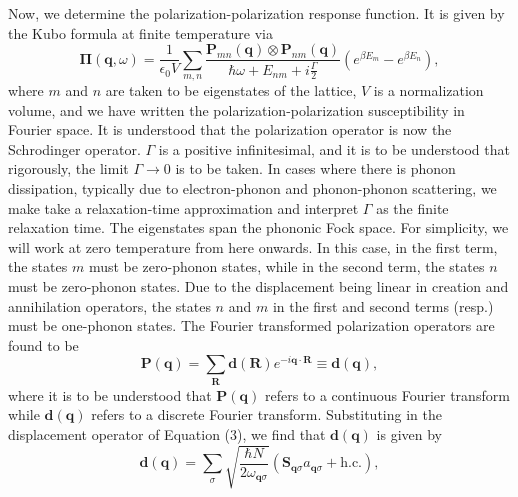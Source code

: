 \documentclass[aps,prb,twocolumn,
	groupedaddress,superscriptaddress,
	amsfonts,amssymb,amsmath,floatfix,
	citeautoscript]{revtex4-1}
\begin{document}
Now, we determine the polarization-polarization response function. It is given by the Kubo formula at finite temperature via
\begin{equation}
\boldsymbol{\Pi}(\mathbf{q},\omega) =  \frac{1}{\epsilon_0 V}\sum\limits_{m,n}\frac{\mathbf{P}_{mn}(\mathbf{q})\otimes\mathbf{P}_{nm}(\mathbf{q})}{\hbar\omega + E_{nm}+i\frac{\Gamma}{2}}\left(e^{\beta E_m}-e^{\beta E_n} \right),
\end{equation}
where $m$ and $n$ are taken to be eigenstates of the lattice, $V$ is a normalization volume, and we have written the polarization-polarization susceptibility in Fourier space. It is understood that the polarization operator is now the Schrodinger operator. $\Gamma$ is a positive infinitesimal, and it is to be understood that rigorously, the limit $\Gamma \rightarrow 0$ is to be taken. In cases where there is phonon dissipation, typically due to electron-phonon and phonon-phonon scattering, we make take a relaxation-time approximation and interpret $\Gamma$ as the finite relaxation time. The eigenstates span the phononic Fock space. For simplicity, we will work at zero temperature from here onwards. In this case, in the first term, the states $m$ must be zero-phonon states, while in the second term, the states $n$ must be zero-phonon states. Due to the displacement being linear in creation and annihilation operators, the states $n$ and $m$ in the first and second terms (resp.) must be one-phonon states. The Fourier transformed polarization operators are found to be
\begin{equation}
\mathbf{P}(\mathbf{q}) = \sum\limits_{\mathbf{R}}\mathbf{d}(\mathbf{R})e^{-i\mathbf{q}\cdot\mathbf{R}} \equiv \mathbf{d}(\mathbf{q}),
\end{equation}
where it is to be understood that $\mathbf{P}(\mathbf{q})$ refers to a continuous Fourier transform while $\mathbf{d}(\mathbf{q})$ refers to a discrete Fourier transform. Substituting in the displacement operator of Equation (3), we find that $\mathbf{d}(\mathbf{q})$ is given by
\begin{equation}
\mathbf{d}(\mathbf{q}) = \sum\limits_{\sigma}\sqrt{\frac{\hbar N}{2\omega_{\mathbf{q}\sigma}}} \left(\mathbf{S}_{\mathbf{q}\sigma}a_{\mathbf{q}\sigma} + \text{h.c.}\right),
\end{equation}
\end{document}
